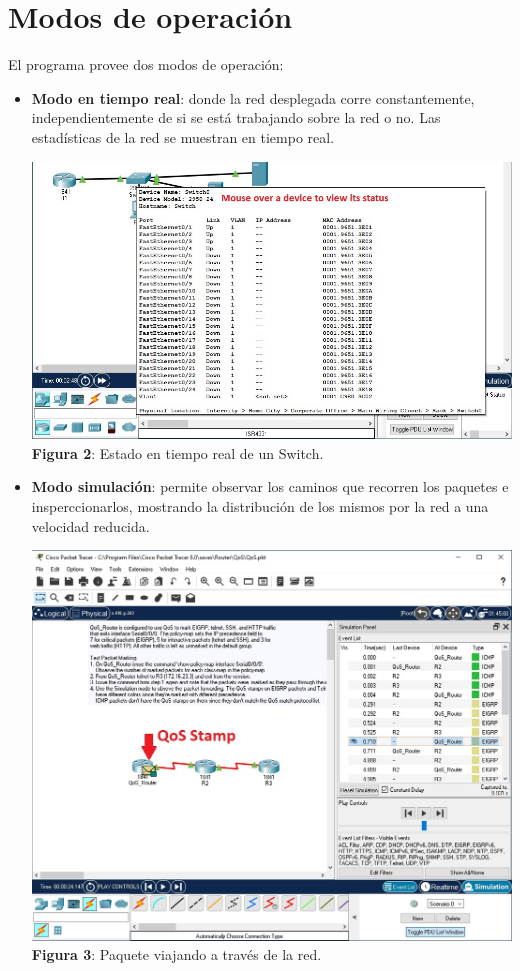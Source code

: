 \documentclass{article}
\begin{document}
    \section{Modos de operación}
    El programa provee dos modos de operación:
    \begin{itemize}
        \item {\bfseries Modo en tiempo real}: donde la red desplegada corre constantemente, independientemente de si se está trabajando sobre la red o no. Las estadísticas de la red se muestran en tiempo real.
        \begin{center}
            \includegraphics[width=0.85\linewidth]{img_3} 
            \linebreak
            \small {\bfseries Figura 2}: Estado en tiempo real de un Switch.
        \end{center} \pagebreak
        \item {\bfseries Modo simulación}: permite observar los caminos que recorren los paquetes e insperccionarlos, mostrando la distribución de los mismos por la red a una velocidad reducida.
        \begin{center}
            \includegraphics[width=0.85\linewidth]{img_4} 
            \linebreak
            \small {\bfseries Figura 3}: Paquete viajando a través de la red.
        \end{center}
    \end{itemize}
\end{document}
